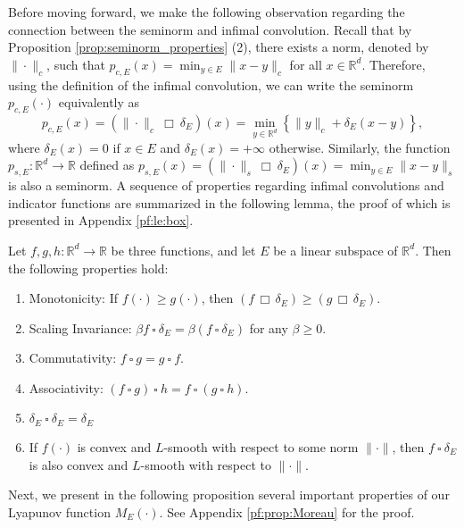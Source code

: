 \documentclass[11 pt]{article}
\begin{document}
	
	Before moving forward, we make the following observation regarding the connection between the seminorm and infimal convolution. Recall that by Proposition \ref{prop:seminorm_properties} (2), there exists a norm, denoted by $\| \cdot \|_c$, such that $p_{c,E}(x) = \min_{y \in E} \| x - y \|_c$ for all $x \in \mathbb{R}^d$.  Therefore, using the definition of the infimal convolution, we can write the seminorm $p_{c,E}(\cdot)$ equivalently as
	\begin{equation}
		\label{eq:seminorm infimal convolution}
		p_{c,E}(x) = \left(\| \cdot \|_c ~\Box~ \delta_E \right)(x)= \min_{y \in \mathbb{R}^d} \left\{\| y \|_c + \delta_{E}(x - y) \right\},
	\end{equation}
	where $\delta_E(x)=0$ if $x\in E$ and $\delta_E(x)=+\infty$ otherwise. Similarly, the function $p_{s,E}:\mathbb{R}^d\to \mathbb{R}$ defined as $p_{s,E}(x)= \left(\| \cdot \|_s ~\Box~ \delta_E \right)(x)= \min_{y \in E} \| x - y \|_s $ is also a seminorm. A sequence of properties regarding infimal convolutions and indicator functions are summarized in the following lemma, the proof of which is presented in Appendix \ref{pf:le:box}.
	
	\begin{lemma}\label{le:box}
		Let $f, g, h:\mathbb{R}^d\to \mathbb{R}$ be three functions, and let $E$ be a linear subspace of $\mathbb{R}^d$. Then the following properties hold:
		\begin{enumerate}[(1)]
			\item  Monotonicity: If $f(\cdot) \geq g(\cdot)$, then $(f\,\Box\, \delta_E)\geq  (g \,\Box\, \delta_E)$.
			\item Scaling Invariance: $\beta f ~\square~ \delta_E = \beta (f ~\square~ \delta_E)$ for any $\beta \geq 0$.
			\item Commutativity: $f ~\square~ g = g ~\square~ f$.
			\item Associativity: $\left(f ~\square~ g\right) ~\square~ h = f ~\square~ \left(g ~\square~ h\right)$.
			\item $\delta_E ~\square~ \delta_E = \delta_E$
			\item If $f(\cdot)$ is convex and $L$-smooth with respect to some norm $\|\cdot\|$, then $f ~\square~ \delta_E$ is also convex and $L$-smooth with respect to $\|\cdot\|$.
		\end{enumerate}
	\end{lemma}
	
	Next, we present in the following proposition several important properties of our Lyapunov function $M_E(\cdot)$. See Appendix \ref{pf:prop:Moreau} for the proof.
	
\end{document}
